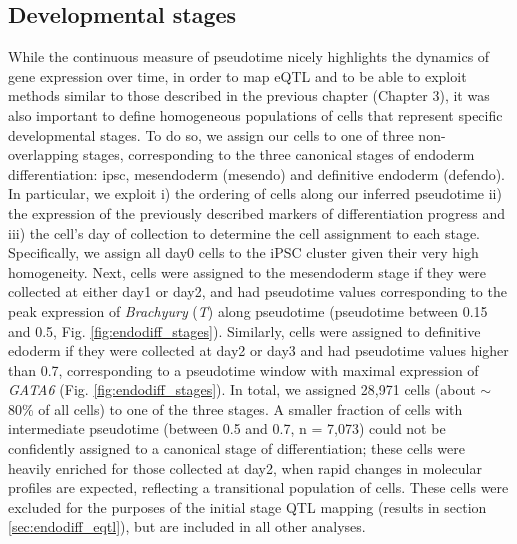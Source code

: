 \subsection{Developmental stages}

While the continuous measure of pseudotime nicely highlights the dynamics of gene expression over time, in order to map eQTL and to be able to exploit methods similar to those described in the previous chapter (Chapter 3), it was also important to define homogeneous populations of cells that represent specific developmental stages.
To do so, we assign our cells to one of three non-overlapping stages, corresponding to the three canonical stages of endoderm differentiation: \gls{ipsc}, mesendoderm (mesendo) and definitive endoderm (defendo).
In particular, we exploit i) the ordering of cells along our inferred pseudotime ii) the expression of the previously described markers of differentiation progress and iii) the cell's day of collection to determine the cell assignment to each stage.
Specifically, we assign all day0 cells to the iPSC cluster given their very high homogeneity.
Next, cells were assigned to the mesendoderm stage if they were collected at either day1 or day2, and had pseudotime values corresponding to the peak expression of \textit{Brachyury} (\textit{T}) along pseudotime (pseudotime between 0.15 and 0.5, Fig. \ref{fig:endodiff_stages}).  
Similarly, cells were assigned to definitive edoderm if they were collected at day2 or day3 and had pseudotime values higher than 0.7, corresponding to a pseudotime window with maximal expression of \textit{GATA6} (Fig. \ref{fig:endodiff_stages}).
In total, we assigned 28,971 cells (about $\sim$80\% of all cells) to one of the three stages. 
A smaller fraction of cells with intermediate pseudotime (between 0.5 and 0.7, n = 7,073) could not be confidently assigned to a canonical stage of differentiation; these cells were heavily enriched for those collected at day2, when rapid changes in molecular profiles are expected, reflecting a transitional population of cells.
These cells were excluded for the purposes of the initial stage QTL mapping (results in section \ref{sec:endodiff_eqtl}), but are included in all other analyses. 

